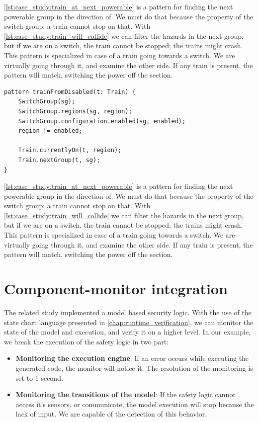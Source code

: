 \cref{lst:case_study:train_at_next_powerable} is a pattern for finding the next powerable group in the direction of. We must do that because the property of the switch group: a train cannot stop on that. With \cref{lst:case_study:train_will_collide} we can filter the hazards in the next group, but if we are on a switch, the train cannot be stopped; the trains might crash. This pattern is specialized in case of a train going towards a switch. We are virtually going through it, and examine the other side. If any train is present, the pattern will match, switching the power off the section.
\\[1ex]

\begin{lstlisting}[caption={Collision detection},label=lst:case_study:train_at_next_powerable]
pattern trainFromDisabled(t: Train) {
	SwitchGroup(sg);
	SwitchGroup.regions(sg, region);
	SwitchGroup.configuration.enabled(sg, enabled);
	region != enabled;
	
	Train.currentlyOn(t, region);
	Train.nextGroup(t, sg);
}
\end{lstlisting}

\cref{lst:case_study:train_at_next_powerable} is a pattern for finding the next powerable group in the direction of. We must do that because the property of the switch group: a train cannot stop on that. With \cref{lst:case_study:train_will_collide} we can filter the hazards in the next group, but if we are on a switch, the train cannot be stopped; the trains might crash. This pattern is specialized in case of a train going towards a switch. We are virtually going through it, and examine the other side. If any train is present, the pattern will match, switching the power off the section.

\section{Component-monitor integration}

The related study\citep{tdk2014} implemented a model based security logic. With the use of the state chart language presented in \vref{chap:runtime_verification}, we can monitor the state of the model and execution, and verify it on a higher level. In our example, we break the execution of the safety logic in two part:
\begin{itemize}
	\item \textbf{Monitoring the execution engine}: If an error occurs while executing the generated code, the monitor will notice it. The resolution of the monitoring is set to 1 second.
	\item \textbf{Monitoring the transitions of the model}: If the safety logic cannot access it's sensors, or communicate, the model execution will stop because the lack of input. We are capable of the detection of this behavior.
\end{itemize}


